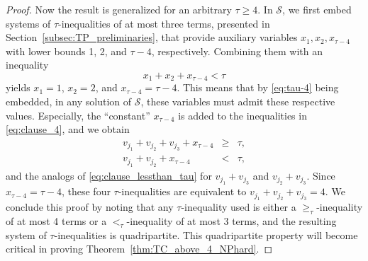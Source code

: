 \documentclass{article}
\theoremstyle{remark}
\theoremstyle{definition}
\begin{document}
\begin{proof}
	Now the result is generalized for an arbitrary $\tau \ge 4$.
	In $\mathcal{S}$, we first embed systems of $\tau$-inequalities of at most three terms, presented in Section~\ref{subsec:TP_preliminaries}, that provide auxiliary variables $x_1, x_2, x_{\tau{-}4}$ with lower bounds 1, 2, and $\tau{-}4$, respectively.
	Combining them with an inequality 
	\begin{equation}\label{eq:tau-4}
		x_1 + x_2 + x_{\tau{-}4} < \tau
	\end{equation} 
	yields $x_1 = 1$, $x_2 = 2$, and $x_{\tau{-}4} = \tau{-}4$. 
	This means that by \eqref{eq:tau-4} being embedded, in any solution of $\mathcal{S}$, these variables must admit these respective values.  
	Especially, the ``constant'' $x_{\tau{-}4}$ is added to the inequalities in \eqref{eq:clause_4}, and we obtain 
	\begin{eqnarray}
		v_{j_1} + v_{j_2} + v_{j_3} + x_{\tau{-}4} &\ge& \tau, \label{eq:clause_atleast_tau} \\
		v_{j_1} + v_{j_2} + x_{\tau{-}4} &<& \tau, \label{eq:clause_lessthan_tau}
	\end{eqnarray}
	and the analogs of \eqref{eq:clause_lessthan_tau} for $v_{j_1} + v_{j_3}$ and $v_{j_2} + v_{j_3}$. 
	Since $x_{\tau-4} = \tau-4$, these four $\tau$-inequalities are equivalent to $v_{j_1} + v_{j_2} + v_{j_3} = 4$.
	We conclude this proof by noting that any $\tau$-inequality used is either a $\ge_\tau$-inequality of at most 4 terms or a $<_\tau$-inequality of at most 3 terms, and the resulting system of $\tau$-inequalities is quadripartite. 
	This quadripartite property will become critical in proving Theorem~\ref{thm:TC_above_4_NPhard}. 
\end{proof}
\end{document}
